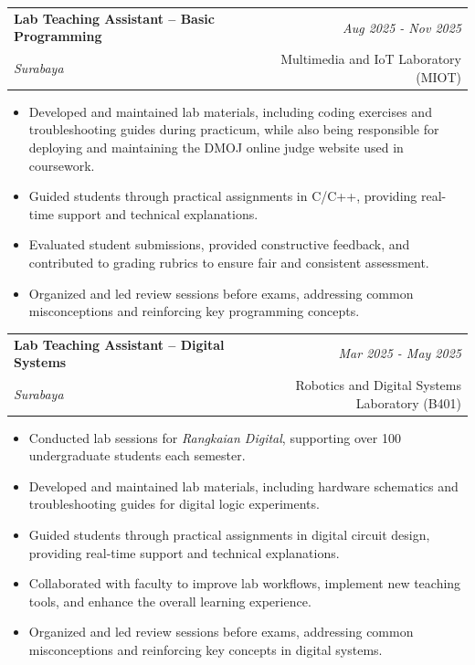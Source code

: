 \documentclass[a4paper,11pt]{article}
\makeatletter
\newcommand{\resumeSubheading}[4]{
\vspace{0.5mm}\item
    \begin{tabular*}{0.98\textwidth}[t]{l@{\extracolsep{\fill}}r}
        \textbf{#1} & \textit{\footnotesize{#4}} \\
        \textit{\footnotesize{#3}} &  \footnotesize{#2}\\
    \end{tabular*}
    \vspace{-2.4mm}
}
\newcommand{\resumeItemListStart}{\begin{justify}\begin{itemize}[leftmargin=3ex, rightmargin=2ex, noitemsep,labelsep=1.2mm,itemsep=0mm]\small}
\newcommand{\resumeItemListEnd}{\end{itemize}\end{justify}\vspace{-2mm}}
\makeatother
\begin{document}
\resumeSubheading
{Lab Teaching Assistant – Basic Programming}{Multimedia and IoT Laboratory (MIOT)}
{Surabaya}{Aug 2025 - Nov 2025}
\resumeItemListStart
\item {Developed and maintained lab materials, including coding exercises and troubleshooting guides during practicum, while also being responsible for deploying and maintaining the DMOJ online judge website used in coursework.}
\item {Guided students through practical assignments in C/C++, providing real-time support and technical explanations.}
\item {Evaluated student submissions, provided constructive feedback, and contributed to grading rubrics to ensure fair and consistent assessment.}
\item {Organized and led review sessions before exams, addressing common misconceptions and reinforcing key programming concepts.}
\resumeItemListEnd
\vspace{-2mm}


\resumeSubheading
{Lab Teaching Assistant – Digital Systems}{Robotics and Digital Systems Laboratory (B401)}
{Surabaya}{Mar 2025 - May 2025}
\resumeItemListStart
\item {Conducted lab sessions for \textit{Rangkaian Digital}, supporting over 100 undergraduate students each semester.}
\item {Developed and maintained lab materials, including hardware schematics and troubleshooting guides for digital logic experiments.}
\item {Guided students through practical assignments in digital circuit design, providing real-time support and technical explanations.}
\item {Collaborated with faculty to improve lab workflows, implement new teaching tools, and enhance the overall learning experience.}
\item {Organized and led review sessions before exams, addressing common misconceptions and reinforcing key concepts in digital systems.}
\resumeItemListEnd
\vspace{-2mm}
\end{document}

